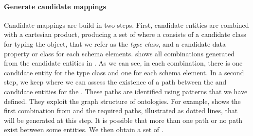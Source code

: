 \begin{table}[]
	\centering
	\caption{Combinations of generated entities for type class and schema elements}
	\label{tab:overviewCombinationsElements}
\end{table}

\paragraph{Generate candidate mappings}
Candidate mappings are build in two steps.
First, candidate entities are combined with a cartesian product, producing a set of 
where a   consists of a candidate class for typing the object, that we refer as the \emph{type class}, and a candidate data property or class for each schema elements.
 shows all combinations generated from the candidate entities in . As we can see, in each combination, there is one candidate entity for the type class and one for each schema element.
In a second step, we keep  where we can assess the existence of a path between the  and candidate entities for the . These paths are identified using patterns that we have defined. They exploit the graph structure of ontologies. 
For example,  shows the first combination from  and the required paths, illustrated as dotted lines, that will be generated at this step. It is possible that more than one path or no path exist between some entities. 
We then obtain a set of .



